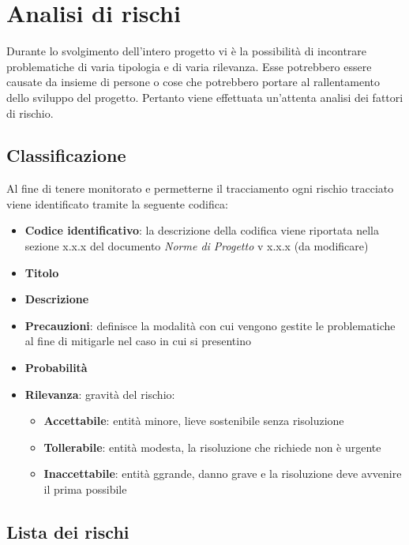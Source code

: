 \section{Analisi di rischi}

Durante lo svolgimento dell’intero progetto vi è la possibilità di incontrare problematiche di varia tipologia e di varia rilevanza. 
Esse potrebbero essere causate da insieme di persone o cose che potrebbero portare al rallentamento dello sviluppo del progetto. 
Pertanto viene effettuata un'attenta analisi dei fattori di rischio. 

\subsection{Classificazione}
Al fine di tenere monitorato e permetterne il tracciamento ogni  rischio tracciato viene identificato tramite la seguente codifica:
\begin{itemize}
    \item \textbf{Codice identificativo}: la descrizione della codifica viene riportata nella sezione x.x.x del documento \textit{Norme di Progetto} v x.x.x (da modificare)
    \item \textbf{Titolo}
    \item \textbf{Descrizione}
    \item \textbf{Precauzioni}: definisce la modalità con cui vengono gestite le problematiche al fine di mitigarle nel caso in cui si presentino
    \item \textbf{Probabilità}
    \item \textbf{Rilevanza}: gravità del rischio:
    \begin{itemize}
        \item \textbf{Accettabile}: entità minore, lieve sostenibile senza risoluzione
        \item \textbf{Tollerabile}: entità modesta, la risoluzione che richiede non è urgente
        \item \textbf{Inaccettabile}: entità ggrande, danno grave e la risoluzione deve avvenire il prima possibile
    \end{itemize}
\end{itemize}

\subsection{Lista dei rischi}

